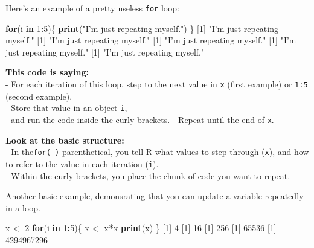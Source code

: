 \documentclass[
]{book}
\newenvironment{Shaded}{\begin{snugshade}}{\end{snugshade}}
\newcommand{\ControlFlowTok}[1]{\textcolor[rgb]{0.13,0.29,0.53}{\textbf{#1}}}
\newcommand{\DecValTok}[1]{\textcolor[rgb]{0.00,0.00,0.81}{#1}}
\newcommand{\KeywordTok}[1]{\textcolor[rgb]{0.13,0.29,0.53}{\textbf{#1}}}
\newcommand{\NormalTok}[1]{#1}
\newcommand{\OperatorTok}[1]{\textcolor[rgb]{0.81,0.36,0.00}{\textbf{#1}}}
\newcommand{\StringTok}[1]{\textcolor[rgb]{0.31,0.60,0.02}{#1}}
\begin{document}
Here's an example of a pretty useless \texttt{for} loop:

\begin{Shaded}
\begin{Highlighting}[]
\ControlFlowTok{for}\NormalTok{(i }\ControlFlowTok{in} \DecValTok{1}\OperatorTok{:}\DecValTok{5}\NormalTok{)\{}
  \KeywordTok{print}\NormalTok{(}\StringTok{"I'm just repeating myself."}\NormalTok{)}
\NormalTok{\}}
\NormalTok{[}\DecValTok{1}\NormalTok{] }\StringTok{"I'm just repeating myself."}
\NormalTok{[}\DecValTok{1}\NormalTok{] }\StringTok{"I'm just repeating myself."}
\NormalTok{[}\DecValTok{1}\NormalTok{] }\StringTok{"I'm just repeating myself."}
\NormalTok{[}\DecValTok{1}\NormalTok{] }\StringTok{"I'm just repeating myself."}
\NormalTok{[}\DecValTok{1}\NormalTok{] }\StringTok{"I'm just repeating myself."}
\end{Highlighting}
\end{Shaded}

\textbf{This code is saying:}\\
- For each iteration of this loop, step to the next value in \texttt{x} (first example) or \texttt{1:5} (second example).\\
- Store that value in an object \texttt{i},\\
- and run the code inside the curly brackets.
- Repeat until the end of \texttt{x}.

\textbf{Look at the basic structure:}\\
- In the\texttt{for(\ )} parenthetical, you tell R what values to step through (\texttt{x}), and how to refer to the value in each iteration (\texttt{i}).\\
- Within the curly brackets, you place the chunk of code you want to repeat.

Another basic example, demonsrating that you can update a variable repeatedly in a loop.

\begin{Shaded}
\begin{Highlighting}[]
\NormalTok{x <-}\StringTok{ }\DecValTok{2}
\ControlFlowTok{for}\NormalTok{(i }\ControlFlowTok{in} \DecValTok{1}\OperatorTok{:}\DecValTok{5}\NormalTok{)\{}
\NormalTok{  x <-}\StringTok{ }\NormalTok{x}\OperatorTok{*}\NormalTok{x}
  \KeywordTok{print}\NormalTok{(x)}
\NormalTok{\}}
\NormalTok{[}\DecValTok{1}\NormalTok{] }\DecValTok{4}
\NormalTok{[}\DecValTok{1}\NormalTok{] }\DecValTok{16}
\NormalTok{[}\DecValTok{1}\NormalTok{] }\DecValTok{256}
\NormalTok{[}\DecValTok{1}\NormalTok{] }\DecValTok{65536}
\NormalTok{[}\DecValTok{1}\NormalTok{] }\DecValTok{4294967296}
\end{Highlighting}
\end{Shaded}
\end{document}
